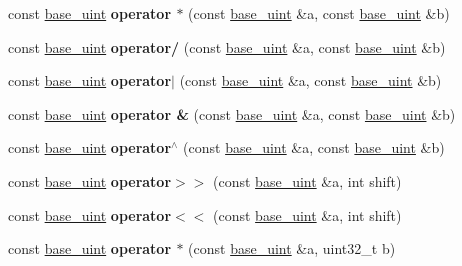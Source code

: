 \begin{DoxyCompactItemize}
const \mbox{\hyperlink{classbase__uint}{base\+\_\+uint}} {\bfseries operator $\ast$} (const \mbox{\hyperlink{classbase__uint}{base\+\_\+uint}} \&a, const \mbox{\hyperlink{classbase__uint}{base\+\_\+uint}} \&b)
\item 
\mbox{\label{classbase__uint_a3027097ea3718db496e486d5c64a6bbd}} 
const \mbox{\hyperlink{classbase__uint}{base\+\_\+uint}} {\bfseries operator/} (const \mbox{\hyperlink{classbase__uint}{base\+\_\+uint}} \&a, const \mbox{\hyperlink{classbase__uint}{base\+\_\+uint}} \&b)
\item 
\mbox{\label{classbase__uint_af11d7776598f6633c139636314f065d6}} 
const \mbox{\hyperlink{classbase__uint}{base\+\_\+uint}} {\bfseries operator$\vert$} (const \mbox{\hyperlink{classbase__uint}{base\+\_\+uint}} \&a, const \mbox{\hyperlink{classbase__uint}{base\+\_\+uint}} \&b)
\item 
\mbox{\label{classbase__uint_aa74c23e8c43f17bc7c4ecabc3406bb77}} 
const \mbox{\hyperlink{classbase__uint}{base\+\_\+uint}} {\bfseries operator \&} (const \mbox{\hyperlink{classbase__uint}{base\+\_\+uint}} \&a, const \mbox{\hyperlink{classbase__uint}{base\+\_\+uint}} \&b)
\item 
\mbox{\label{classbase__uint_aa9c66282ad78846e8310984aeb2df49d}} 
const \mbox{\hyperlink{classbase__uint}{base\+\_\+uint}} {\bfseries operator$^\wedge$} (const \mbox{\hyperlink{classbase__uint}{base\+\_\+uint}} \&a, const \mbox{\hyperlink{classbase__uint}{base\+\_\+uint}} \&b)
\item 
\mbox{\label{classbase__uint_a9d619adcbf9ad5539f5e98f739edd15d}} 
const \mbox{\hyperlink{classbase__uint}{base\+\_\+uint}} {\bfseries operator$>$$>$} (const \mbox{\hyperlink{classbase__uint}{base\+\_\+uint}} \&a, int shift)
\item 
\mbox{\label{classbase__uint_acee16d973ae59087cd962720773f53dd}} 
const \mbox{\hyperlink{classbase__uint}{base\+\_\+uint}} {\bfseries operator$<$$<$} (const \mbox{\hyperlink{classbase__uint}{base\+\_\+uint}} \&a, int shift)
\item 
\mbox{\label{classbase__uint_a7d23d0ec9b97f9b0d38903302e26c3f4}} 
const \mbox{\hyperlink{classbase__uint}{base\+\_\+uint}} {\bfseries operator $\ast$} (const \mbox{\hyperlink{classbase__uint}{base\+\_\+uint}} \&a, uint32\+\_\+t b)

\end{DoxyCompactItemize}
